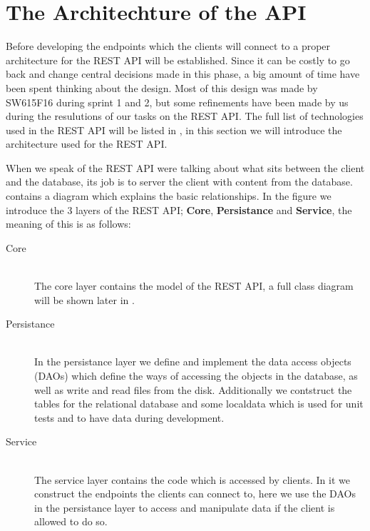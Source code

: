 \section{The Architechture of the API}\label{architechture}
Before developing the endpoints which the clients will connect to a proper architecture for the REST API will be established. 
Since it can be costly to go back and change central decisions made in this phase, a big amount of time have been spent thinking about the design. 
Most of this design was made by SW615F16 during sprint 1 and 2, but some refinements have been made by us during the resulutions of our tasks on the REST API. 
The full list of technologies used in the REST API will be listed in , in this section we will introduce the architecture used for the REST API. 

When we speak of the REST API were talking about what sits between the client and the database, its job is to server the client with content from the database. 
 contains a diagram which explains the basic relationships. 
In the figure we introduce the 3 layers of the REST API; \textbf{Core}, \textbf{Persistance} and \textbf{Service}, the meaning of this is as follows:
\begin{description}
    \item[Core] \hfill \\ 
    The core layer contains the model of the REST API, a full class diagram will be shown later in .

    \item[Persistance] \hfill \\ 
    In the persistance layer we define and implement the data access objects (DAOs) which define the ways of accessing the objects in the database, as well as write and read files from the disk. 
    Additionally we contstruct the tables for the relational database and some localdata which is used for unit tests and to have data during development. 

    \item[Service] \hfill \\ 
    The service layer contains the code which is accessed by clients.
    In it we construct the endpoints the clients can connect to, here we use the DAOs in the persistance layer to access and manipulate data if the client is allowed to do so. 
\end{description}

